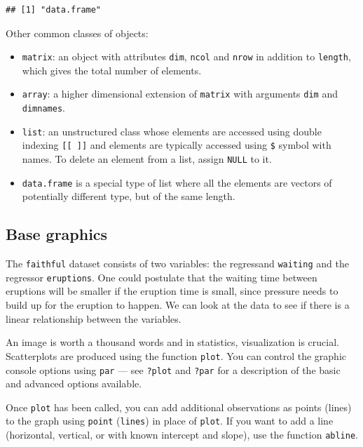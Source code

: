 \documentclass[
  11pt,
  letterpaper,
]{book}
\providecommand{\tightlist}{%
  \setlength{\itemsep}{0pt}\setlength{\parskip}{0pt}}
\theoremstyle{definition}
\theoremstyle{definition}
\theoremstyle{definition}
\theoremstyle{remark}
\begin{document}
\begin{verbatim}
## [1] "data.frame"
\end{verbatim}

Other common classes of objects:

\begin{itemize}
\tightlist
\item
  \texttt{matrix}: an object with attributes \texttt{dim}, \texttt{ncol} and \texttt{nrow} in addition to \texttt{length}, which gives the total number of elements.
\item
  \texttt{array}: a higher dimensional extension of \texttt{matrix} with arguments \texttt{dim} and \texttt{dimnames}.
\item
  \texttt{list}: an unstructured class whose elements are accessed using double indexing \texttt{{[}{[}\ {]}{]}} and elements are typically accessed using \texttt{\$} symbol with names. To delete an element from a list, assign \texttt{NULL} to it.
\item
  \texttt{data.frame} is a special type of list where all the elements are vectors of potentially different type, but of the same length.
\end{itemize}

\hypertarget{base-graphics}{%
\subsection*{Base graphics}\label{base-graphics}}

The \texttt{faithful} dataset consists of two variables: the regressand \texttt{waiting} and the regressor \texttt{eruptions}. One could postulate that the waiting time between eruptions will be smaller if the eruption time is small, since pressure needs to build up for the eruption to happen. We can look at the data to see if there is a linear relationship between the variables.

An image is worth a thousand words and in statistics, visualization is crucial. Scatterplots are produced using the function \texttt{plot}. You can control the graphic console options using \texttt{par} --- see \texttt{?plot} and \texttt{?par} for a description of the basic and advanced options available.

Once \texttt{plot} has been called, you can add additional observations as points (lines) to the graph using \texttt{point} (\texttt{lines}) in place of \texttt{plot}. If you want to add a line (horizontal, vertical, or with known intercept and slope), use the function \texttt{abline}.
\end{document}
